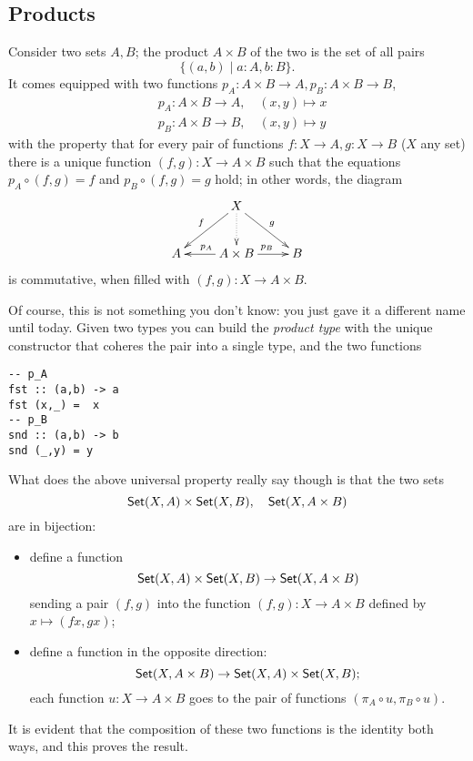 \documentclass[11pt]{article}
\begin{document}
\subsection{Products}
Consider two sets \(A,B\); the product \(A\times B\) of the two is the set of all pairs
\[
	\{(a,b)\mid a : A, b : B\}.
\]
It comes equipped with two functions \(p_A : A\times B \to A, p_B : A\times B \to B\),
\begin{align*}
	 & p_A \colon A \times B \to A,\quad (x,y) \mapsto x \\
	 & p_B \colon A \times B \to B,\quad (x,y) \mapsto y
\end{align*}
with the property that for every pair of functions \(f : X \to A, g : X \to B\) (\(X\) any set) there is a unique function \((f,g) : X \to A\times B\) such that the equations \(p_A \circ (f,g)=f\) and \(p_B\circ (f,g)=g\) hold; in other words, the diagram
\begin{equation}
	\vcenter{\xymatrix{
			& X \ar[dl]_f \ar[dr]^g \ar@{.>}[d] & \\
			A & A \times B \ar[l]_{p_A} \ar[r]^{p_B} & B
		}}
\end{equation}
is commutative, when filled with \((f,g) : X \to A\times B\).

Of course, this is not something you don't know: you just gave it a different name until today. Given two types  you can build the \emph{product type}  with the unique constructor \mil{(,)} that coheres the pair  into a single type, and the two functions
\begin{verbatim}
-- p_A
fst :: (a,b) -> a
fst (x,_) =  x
-- p_B
snd :: (a,b) -> b
snd (_,y) = y
\end{verbatim}
What does the above universal property really say though is that the two sets
\begin{equation}
	{\sf Set}(X, A)\times {\sf Set}(X,B),\quad {\sf Set}(X, A\times B)
\end{equation}
are in bijection:
\begin{itemize}
	\item define a function $${\sf Set}(X, A)\times {\sf Set}(X,B)\to {\sf Set}(X, A\times B)$$ sending a pair $(f,g)$ into the function $(f,g) : X \to A\times B$ defined by $x\mapsto (fx, gx)$;
	\item define a function in the opposite direction: $${\sf Set}(X, A\times B) \to{\sf Set}(X, A)\times {\sf Set}(X,B);$$ each function $u : X\to A\times B$ goes to the pair of functions $(\pi_A\circ u, \pi_B\circ u)$.
\end{itemize}
It is evident that the composition of these two functions is the identity both ways, and this proves the result.
\end{document}
